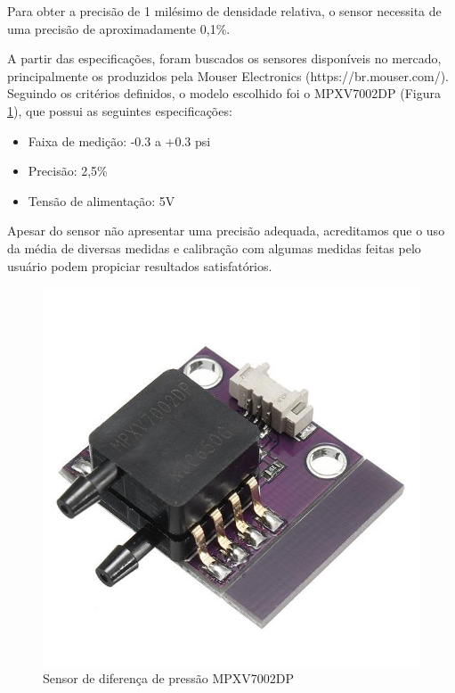 Para obter a precisão de 1 milésimo de densidade relativa, o sensor necessita de uma precisão de aproximadamente 0,1\%.


A partir das especificações, foram buscados os sensores disponíveis no mercado, principalmente os produzidos pela Mouser Electronics (https://br.mouser.com/). Seguindo os critérios definidos, o modelo escolhido foi o MPXV7002DP (Figura \ref{fig:MPXV7002DP}), que possui as seguintes especificações:

\begin{itemize}
\item Faixa de medição: -0.3 a +0.3 psi
\item Precisão: 2,5\%
\item Tensão de alimentação: 5V
\end{itemize}

Apesar do sensor não apresentar uma precisão adequada, acreditamos que o uso da média de diversas medidas e calibração com algumas medidas feitas pelo usuário podem propiciar resultados satisfatórios.

\begin{figure}[h]
    \centering
    \includegraphics[scale=0.35]{figuras/projeto/hardware/MPXV7002DP.jpg}
    \caption{Sensor de diferença de pressão MPXV7002DP}
    \label{fig:MPXV7002DP}
\end{figure}


